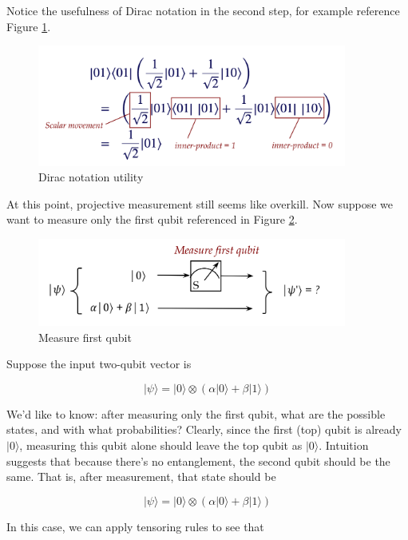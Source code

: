 \documentclass[main.tex]{subfiles}
\begin{document}
    Notice the usefulness of Dirac notation in the second step, for example reference Figure \ref{fig:04measure3}.
    
    \begin{figure}
        \centering
        \includegraphics[width=4in]{notes/figs/n07/04measure3.png}
        \caption{Dirac notation utility}
        \label{fig:04measure3}
    \end{figure} 
    
    At this point, projective measurement still seems like overkill. Now suppose we want to measure only the first qubit referenced in Figure \ref{fig:05measure4}.
    
    \begin{figure}
        \centering
        \includegraphics[width=4in]{notes/figs/n07/05measure4.png}
        \caption{Measure first qubit}
        \label{fig:05measure4}
    \end{figure} 
    
    Suppose the input two-qubit vector is
    
    $$
    |\psi\rangle=|0\rangle \otimes(\alpha|0\rangle+\beta|1\rangle)
    $$
    
    We'd like to know: after measuring only the first qubit, what are the possible states, and with what probabilities? Clearly, since the first (top) qubit is already $|0\rangle$, measuring this qubit alone should leave the top qubit as $|0\rangle$. Intuition suggests that because there's no entanglement, the second qubit should be the same. That is, after measurement, that state should be
    
    $$
    |\psi\rangle=|0\rangle \otimes(\alpha|0\rangle+\beta|1\rangle)
    $$
    
    In this case, we can apply tensoring rules to see that
    
\end{document}
